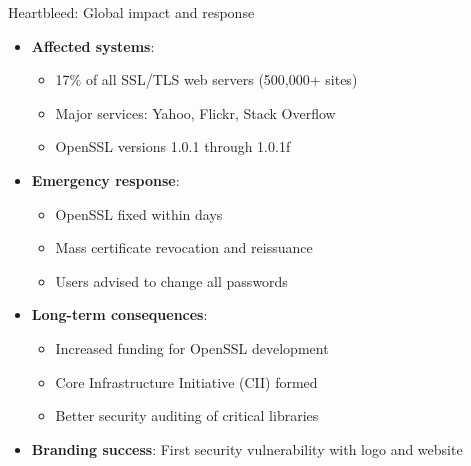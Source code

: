 \documentclass[aspectratio=169, lualatex, handout]{beamer}
\begin{document}
\begin{frame}{Heartbleed: Global impact and response}
	\begin{itemize}[<+->]
		\item \textbf{Affected systems}:
		      \begin{itemize}
			      \item 17\% of all SSL/TLS web servers (500,000+ sites)
			      \item Major services: Yahoo, Flickr, Stack Overflow
			      \item OpenSSL versions 1.0.1 through 1.0.1f
		      \end{itemize}
		\item \textbf{Emergency response}:
		      \begin{itemize}
			      \item OpenSSL fixed within days
			      \item Mass certificate revocation and reissuance
			      \item Users advised to change all passwords
		      \end{itemize}
		\item \textbf{Long-term consequences}:
		      \begin{itemize}
			      \item Increased funding for OpenSSL development
			      \item Core Infrastructure Initiative (CII) formed
			      \item Better security auditing of critical libraries
		      \end{itemize}
		\item \textbf{Branding success}: First security vulnerability with logo and website
	\end{itemize}
\end{frame}
\end{document}
